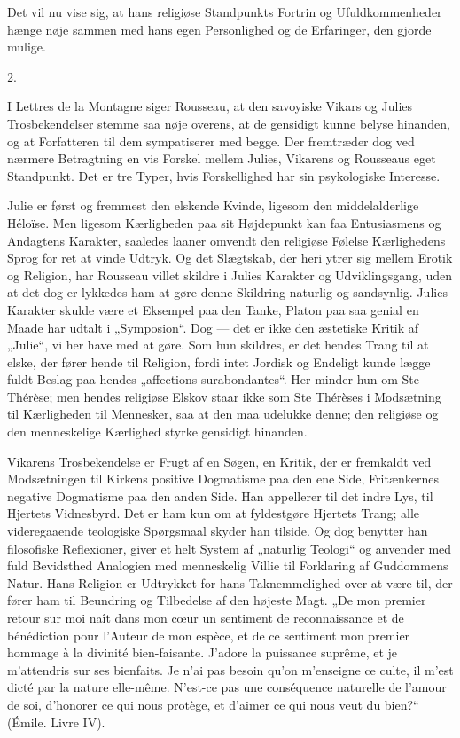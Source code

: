 \documentclass[12pt,a4paper,openany]{book}
\newcommand{\opage}[1]{\marginnote{\footnotesize\textit{[#1]}}}
\begin{document}
Det vil nu vise sig, at hans religiøse Standpunkts Fortrin og
Ufuldkommenheder hænge nøje sammen med hans egen Personlighed
og de Erfaringer, den gjorde mulige.

\begin{center}2.\end{center}

I Lettres de la Montagne siger Rousseau, at den savoyiske
Vikars og Julies Trosbekendelser stemme saa nøje overens, at
de gensidigt kunne belyse hinanden, og at Forfatteren til dem
sympatiserer med begge. Der fremtræder dog ved nærmere
Betragtning en vis Forskel mellem Julies, Vikarens og Rousseaus
eget Standpunkt. Det er tre Typer, hvis Forskellighed har sin
psykologiske Interesse.

Julie er først og fremmest den elskende Kvinde, ligesom
den middelalderlige Héloïse. Men ligesom Kærligheden paa sit
Højdepunkt kan faa Entusiasmens og Andagtens Karakter, saaledes
laaner omvendt den religiøse Følelse Kærlighedens Sprog
for ret at vinde Udtryk. Og det Slægtskab, der heri ytrer sig
mellem Erotik og Religion, har Rousseau villet skildre i Julies
Karakter og Udviklingsgang, uden at det dog er lykkedes ham
at gøre denne Skildring naturlig og sandsynlig. Julies Karakter
skulde være et Eksempel paa den Tanke, Platon paa saa genial
en Maade har udtalt i „Symposion“. Dog --- det er ikke den
æstetiske Kritik af „Julie“, vi her have med at gøre. Som
hun skildres, er det hendes Trang til at elske, der fører hende
til Religion, fordi intet Jordisk og Endeligt kunde lægge fuldt
Beslag paa hendes „affections surabondantes“. Her minder hun
om Ste Thérèse; men hendes religiøse Elskov staar ikke som
Ste Thérèses i Modsætning til Kærligheden til Mennesker, saa
at den maa udelukke denne; den religiøse og den menneskelige
Kærlighed styrke gensidigt hinanden.

Vikarens Trosbekendelse er Frugt af en Søgen, en Kritik,
der er fremkaldt ved Modsætningen til Kirkens positive Dogmatisme
paa den ene Side, Fritænkernes negative Dogmatisme
paa den anden Side. Han appellerer til det indre Lys, til
\setcounter{footnote}{0}%
\opage{146}Hjertets Vidnesbyrd. Det er ham kun om at fyldestgøre Hjertets
Trang; alle videregaaende teologiske Spørgsmaal skyder han
tilside. Og dog benytter han filosofiske Reflexioner, giver et helt
System af „naturlig Teologi“ og anvender med fuld Bevidsthed
Analogien med menneskelig Villie til Forklaring af Guddommens
Natur. Hans Religion er Udtrykket for hans Taknemmelighed
over at være til, der fører ham til Beundring og Tilbedelse af
den højeste Magt. „De mon premier retour sur moi naît dans
mon cœur un sentiment de reconnaissance et de bénédiction
pour l’Auteur de mon espèce, et de ce sentiment mon premier
hommage à la divinité bien-faisante. J’adore la puissance suprême,
et je m’attendris sur ses bienfaits. Je n’ai pas besoin qu’on
m’enseigne ce culte, il m’est dicté par la nature elle-même. N’est-ce pas une conséquence naturelle de l’amour de soi,
d’honorer ce qui nous protège, et d’aimer ce qui nous veut du
bien?“ (Émile. Livre IV).
\end{document}
